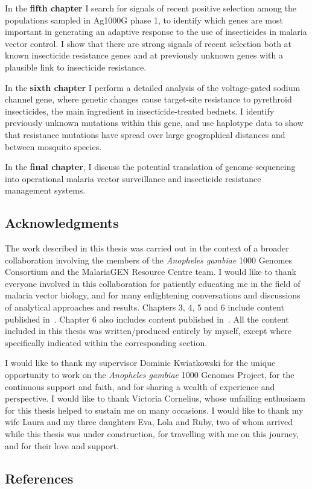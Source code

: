 In the \textbf{fifth chapter} I search for signals of recent positive selection among the populations sampled in Ag1000G phase 1, to identify which genes are most important in generating an adaptive response to the use of insecticides in malaria vector control.
%
I show that there are strong signals of recent selection both at known insecticide resistance genes and at previously unknown genes with a plausible link to insecticide resistance.


In the \textbf{sixth chapter} I perform a detailed analysis of the voltage-gated sodium channel gene, where genetic changes cause target-site resistance to pyrethroid insecticides, the main ingredient in insecticide-treated bednets.
%
I identify previously unknown mutations within this gene, and use haplotype data to show that resistance mutations have spread over large geographical distances and between mosquito species.


In the \textbf{final chapter}, I discuss the potential translation of genome sequencing into operational malaria vector surveillance and insecticide resistance management systems.


\begin{refsection}
\chapter*{Acknowledgments}


The work described in this thesis was carried out in the context of a broader collaboration involving the members of the \textit{Anopheles gambiae} 1000 Genomes Consortium and the MalariaGEN Resource Centre team.
%
I would like to thank everyone involved in this collaboration for patiently educating me in the field of malaria vector biology, and for many enlightening conversations and discussions of analytical approaches and results.
%
Chapters 3, 4, 5 and 6 include content published in~\textcite{Ag1000G2017}.
%
Chapter 6 also includes content published in~\textcite{Clarkson2018}.
%
All the content included in this thesis was written/produced entirely by myself, except where specifically indicated within the corresponding section.


I would like to thank my supervisor Dominic Kwiatkowski for the unique opportunity to work on the \textit{Anopheles gambiae} 1000 Genomes Project, for the continuous support and faith, and for sharing a wealth of experience and perspective.
%
I would like to thank Victoria Cornelius, whose unfailing enthusiasm for this thesis helped to sustain me on many occasions.
%
I would like to thank my wife Laura and my three daughters Eva, Lola and Ruby, two of whom arrived while this thesis was under construction, for travelling with me on this journey, and for their love and support.


\section*{References}




\end{refsection}
